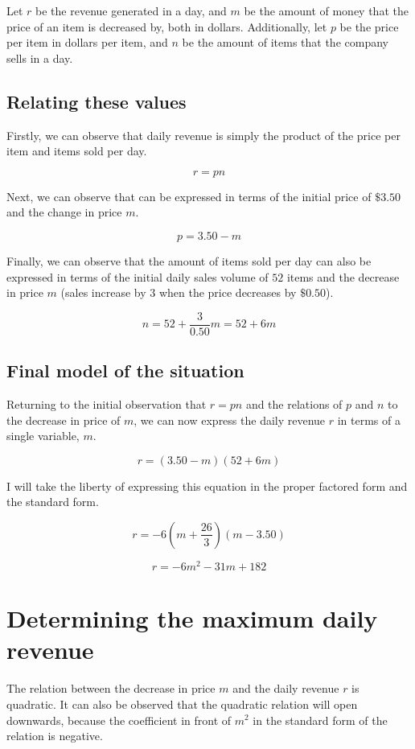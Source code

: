 \documentclass[12pt]{article}
\begin{document}
Let $r$ be the revenue generated in a day, and $m$ be the amount of money that the price of an item is decreased by, both in dollars.
Additionally, let $p$ be the price per item in dollars per item, and $n$ be the amount of items that the company sells in a day.

\subsection{Relating these values}

Firstly, we can observe that daily revenue is simply the product of the price per item and items sold per day.

\[
r = pn
\]

Next, we can observe that can be expressed in terms of the initial price of $\$3.50$ and the change in price $m$.

\[
p = 3.50 - m
\]

Finally, we can observe that the amount of items sold per day can also be expressed in terms of the initial daily sales volume of $52$ items and the decrease in price $m$ (sales increase by $3$ when the price decreases by $\$0.50$).

\[
n = 52 + \frac{3}{0.50}m = 52 + 6m
\]

\subsection{Final model of the situation}

Returning to the initial observation that $r = pn$ and the relations of $p$ and $n$ to the decrease in price of $m$, we can now express the daily revenue $r$ in terms of a single variable, $m$.

\[
r = (3.50 - m)(52 + 6m)
\]

I will take the liberty of expressing this equation in the proper factored form and the standard form.

\[
r = -6\left(m + \frac{26}{3}\right)(m - 3.50)
\]

\[
r = -6m^2 - 31m + 182
\]

\newpage

\section{Determining the maximum daily revenue}

The relation between the decrease in price $m$ and the daily revenue $r$ is quadratic.
It can also be observed that the quadratic relation will open downwards, because the coefficient in front of $m^2$ in the standard form of the relation is negative.
\end{document}
